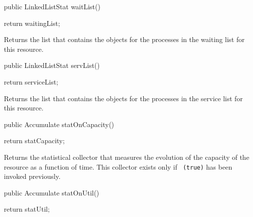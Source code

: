\begin{htmlonly}
\end{htmlonly}
\begin{code}

   public LinkedListStat waitList() \begin{hide} { 
      return waitingList;
   }\end{hide}
\end{code}
\begin{tabb}  Returns the list that contains the
   objects
  for the processes in the waiting list for this resource.
\end{tabb}
\begin{htmlonly}
\end{htmlonly}
\begin{code}

   public LinkedListStat servList() \begin{hide} { 
      return serviceList;
   }\end{hide}
\end{code}
\begin{tabb}  Returns the list that contains the 
   objects
  for the processes in the service list for this resource.
\end{tabb}
\begin{htmlonly}
\end{htmlonly}
\begin{code}

   public Accumulate statOnCapacity() \begin{hide} {
      return statCapacity;
   }\end{hide}
\end{code}
\begin{tabb}  Returns the statistical collector that measures the evolution of
  the capacity of the resource as a function of time.
  This collector exists only if ~\texttt{(true)} has been invoked
  previously.  
\end{tabb}
\begin{htmlonly}
\end{htmlonly}
\begin{code}

   public Accumulate statOnUtil() \begin{hide} {
      return statUtil;
   }\end{hide}
\end{code}
